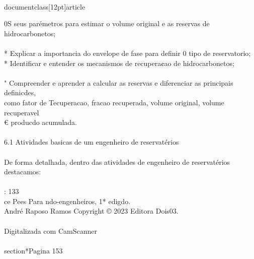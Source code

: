 \\documentclass[12pt]{article}
\begin{document}
0S seus parémetros para estimar o volume original e as reservas de hidrocarbonetos;\\
\\
* Explicar a importancia do envelope de fase para definir 0 tipo de reservatorio;\\
* Identificar e entender os mecanismos de recupera¢ao de hidrocarbonetos;\\
\\
" Compreender e aprender a calcular as reservas e diferenciar as principais definicdes,\\
como fator de Tecuperacao, fracao recuperada, volume original, volume recuperavel\\
€ producdo acumulada.\\
\\
6.1 Atividades basicas de um engenheiro de reservatérios\\
\\
De forma detalhada, dentro das atividades de engenheiro de reservatérios destacamos:\\
\\
: 133\\
ce Pees Para ndo-engenheiros, 1* edigdo.\\
André Raposo Ramos Copyright © 2023 Editora Dois03.\\
\\
Digitalizada com CamScanner\\

\\section*{Pagina 153}
\end{document}
